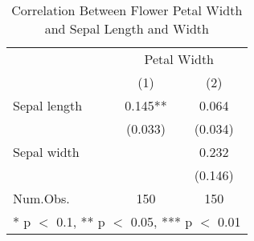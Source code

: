 \begin{table}[H]
\caption{Correlation Between Flower Petal Width and Sepal Length and Width} 
\label{tab:flower_table}
\centering
\begin{tabular}[t]{lcc}
\toprule
& \multicolumn{2}{c}{Petal Width} \\
  & (1) & (2)\\
\midrule
Sepal length & 0.145** & 0.064\\
 & (0.033) & (0.034)\\
Sepal width &  & 0.232\\
 &  & (0.146)\\
\midrule
Num.Obs. & 150 & 150\\
\bottomrule
\multicolumn{3}{l}{\rule{0pt}{1em}* p $<$ 0.1, ** p $<$ 0.05, *** p $<$ 0.01}\\
\end{tabular}
\end{table}
